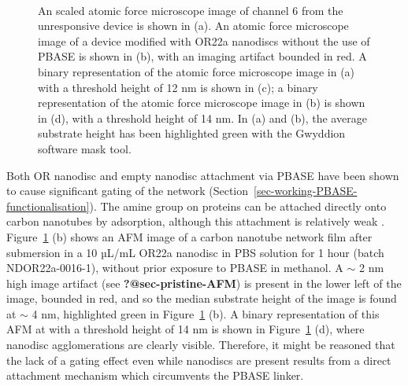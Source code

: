 \documentclass[
  a4paper,
]{scrbook}
\begin{document}
\begin{figure}
\begin{minipage}[t]{0.01\linewidth}
{~

}

\end{minipage}%

\caption{\label{fig-OR22a-variability-AFM-comparison}An scaled atomic
force microscope image of channel 6 from the unresponsive device is
shown in (a). An atomic force microscope image of a device modified with
OR22a nanodiscs without the use of PBASE is shown in (b), with an
imaging artifact bounded in red. A binary representation of the atomic
force microscope image in (a) with a threshold height of 12 nm is shown
in (c); a binary representation of the atomic force microscope image in
(b) is shown in (d), with a threshold height of 14 nm. In (a) and (b),
the average substrate height has been highlighted green with the
Gwyddion software mask tool.}

\end{figure}

Both OR nanodisc and empty nanodisc attachment via PBASE have been shown
to cause significant gating of the network
(Section~\ref{sec-working-PBASE-functionalisation}). The amine group on
proteins can be attached directly onto carbon nanotubes by adsorption,
although this attachment is relatively weak \autocite{Bradley2004}.
Figure~\ref{fig-OR22a-variability-AFM-comparison} (b) shows an AFM image
of a carbon nanotube network film after submersion in a 10 µL/mL OR22a
nanodisc in PBS solution for 1 hour (batch NDOR22a-0016-1), without
prior exposure to PBASE in methanol. A \(\sim\) 2 nm high image artifact
(see \textbf{?@sec-pristine-AFM}) is present in the lower left of the
image, bounded in red, and so the median substrate height of the image
is found at \(\sim\) 4 nm, highlighted green in
Figure~\ref{fig-OR22a-variability-AFM-comparison} (b). A binary
representation of this AFM at with a threshold height of 14 nm is shown
in Figure~\ref{fig-OR22a-variability-AFM-comparison} (d), where nanodisc
agglomerations are clearly visible. Therefore, it might be reasoned that
the lack of a gating effect even while nanodiscs are present results
from a direct attachment mechanism which circumvents the PBASE linker.
\end{document}
